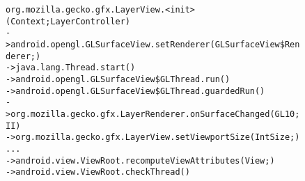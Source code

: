\begin{figure}[t]
\begin{CodeOut}
\begin{alltt}
   org.mozilla.gecko.gfx.LayerView.<init>(Context;LayerController)
-> android.opengl.GLSurfaceView.setRenderer(GLSurfaceView\$Renderer;)
-> java.lang.Thread.start()
-> android.opengl.GLSurfaceView\$GLThread.run()
-> android.opengl.GLSurfaceView\$GLThread.guardedRun()
-> org.mozilla.gecko.gfx.LayerRenderer.onSurfaceChanged(GL10;II)
-> org.mozilla.gecko.gfx.LayerView.setViewportSize(IntSize;)
   ... 
-> android.view.ViewRoot.recomputeViewAttributes(View;)
-> android.view.ViewRoot.checkThread()
\end{alltt}
\end{CodeOut}
\tinystep
\vspace*{-3.0ex}  %
\end{figure}

